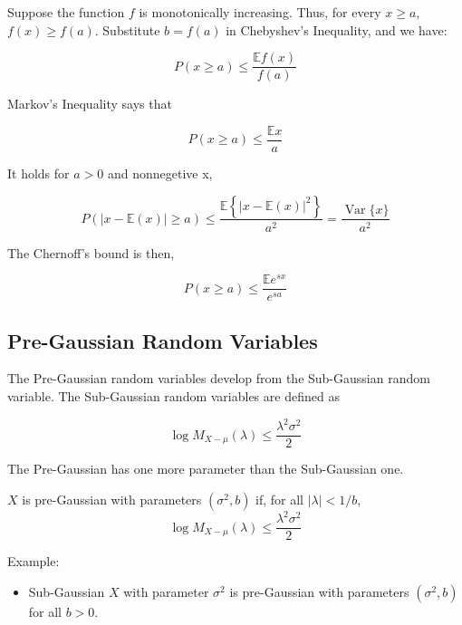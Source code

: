 Suppose the function $f$ is monotonically increasing.
Thus, for every $x \geq a$, $f(x) \geq f(a)$. 
Substitute $b = f(a)$ in Chebyshev's Inequality, and we have:

\begin{equation}
  P(x \geq a) \leq \frac{\mathbb{E}f(x)}{f(a)}
\end{equation}

Markov's Inequality says that

\begin{equation}
  P(x \geq a) \leq \frac{\mathbb{E}x}{a}
\end{equation}

It holds for $a >0$ and nonnegetive x, 

\begin{equation}
  P(|x-\mathbb{E}(x)| \geq a) \leq \frac{\mathbb{E}\left\{|x-\mathbb{E}(x)|^{2}\right\}}{a^{2}}=\frac{\operatorname{Var}\{x\}}{a^{2}}
\end{equation}

The Chernoff's bound is then,

\begin{equation}
  P(x \geq a) \leq \frac{\mathbb{E}e^{sx}}{e^{sa}}
\end{equation}

\subsection{Pre-Gaussian Random Variables}
The Pre-Gaussian random variables develop from the Sub-Gaussian random variable.
The Sub-Gaussian random variables are defined as 

\begin{equation}
  \log M_{X-\mu}(\lambda) \leq \frac{\lambda^{2} \sigma^{2}}{2}
\end{equation}

The Pre-Gaussian has one more parameter than the Sub-Gaussian one.

\begin{definition} \cite*{Bartlett:2020}
  $X$ is pre-Gaussian with parameters $(\sigma^2,b)$ if, for all $\left| \lambda \right| < 1/b$,
  \begin{equation}
    \log M_{X-\mu}(\lambda) \leq \frac{\lambda^{2} \sigma^{2}}{2}
  \end{equation}
\end{definition}

Example:

\begin{itemize}
  \item Sub-Gaussian $X$ with parameter $\sigma^2$ is pre-Gaussian with parameters $(\sigma^2, b)$ for all $b>0$.
\end{itemize}

